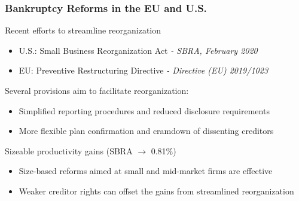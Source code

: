 \documentclass[aspectratio=169,xcolor=table]{beamer}
\begin{document}
\begin{frame}[label=EUandUS]  \frametitle{Bankruptcy Reforms in the EU and U.S. \hfill \hyperlink{sbra_emp}{} \hyperlink{SBRA}{}  }

Recent efforts to streamline reorganization
\begin{itemize} \small
    \item U.S.: Small Business Reorganization Act \hspace{11mm }\textit{- SBRA, February 2020} 
    \item EU: Preventive Restructuring Directive \hspace{12.32mm} \textit{- Directive (EU) 2019/1023}
\end{itemize} \normalsize   \vspace{3mm}

Several provisions aim to facilitate reorganization:
\begin{itemize} \small
    \item Simplified reporting procedures and reduced disclosure requirements 
    \item More flexible plan confirmation and cramdown of dissenting creditors
\end{itemize} \normalsize \vspace{3mm}

Sizeable productivity gains \small (SBRA $\rightarrow$ 0.81\%) \hfill \hyperlink{PolicyDesign}{} 
\begin{itemize} \small
    \item Size-based reforms aimed at small and mid-market firms are effective
    \item Weaker creditor rights can offset the gains from streamlined reorganization
\end{itemize} \normalsize


\end{frame}
\end{document}
